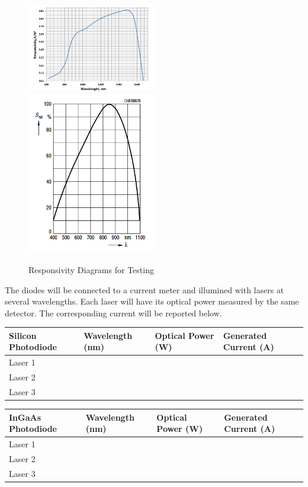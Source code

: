 \begin{figure}[H]
    \caption{Responsivity Diagrams for Testing}
    \centering
    \includegraphics[width=0.5\textwidth]{images/InGaAsResponsivityCurve.png}
    \includegraphics[width=0.5\textwidth]{images/NewarkBPX61.png}
\end{figure}

The diodes will be connected to a current meter and illumined with lasers at several wavelengths. Each laser will have its optical power measured by the same detector. The corresponding current will be reported below.

\begin{table}[H]
	\centering
	\label{table:VIS Diode Response}
	\bigskip
	\begin{tabular}{|p{2cm}|p{2.5cm}|p{2cm}|p{2.75cm}|}
	\hline
	Silicon Photodiode & Wavelength (nm) & Optical Power (W) & Generated Current (A)\\
	\hline
	Laser 1 & & & \\
	\hline
	Laser 2 & & & \\
	\hline
	Laser 3 & & & \\
	\hline
	\end{tabular}
\end{table}

\begin{table}[H]
	\centering
	\label{table:NIR Diode Response}
	\bigskip
	\begin{tabular}{|p{2cm}|p{2.5cm}|p{2cm}|p{2.75cm}|}
	\hline
	InGaAs Photodiode & Wavelength (nm) & Optical Power (W) & Generated Current (A)\\
	\hline
	Laser 1 & & & \\
	\hline
	Laser 2 & & & \\
	\hline
	Laser 3 & & & \\
	\hline
	\end{tabular}
\end{table}

